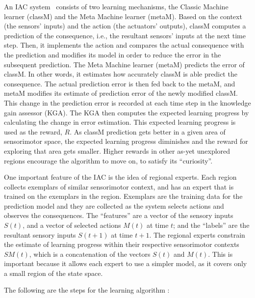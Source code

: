 An IAC system~\cite{Oudeyer2007} consists of two learning mechanisms, the Classic Machine learner (classM) and the Meta Machine learner (metaM). Based on the context (the sensors' inputs) and the action (the actuators' outputs), classM computes a prediction of the consequence, i.e., the resultant sensors' inputs at the next time step. Then, it implements the action and compares the actual consequence with the prediction and modifies its model in order to reduce the error in the subsequent prediction. The Meta Machine learner (metaM) predicts the error of classM. In other words, it estimates how accurately classM is able predict the consequence. The actual prediction error is then fed back to the metaM, and metaM modifies its estimate of prediction error of the newly modified classM. This change in the prediction error is recorded at each time step in the knowledge gain assessor (KGA). The KGA then computes the expected learning progress by calculating the change in error estimation. This expected learning progress is used as the reward, $R$. As classM prediction gets better in a given area of sensorimotor space, the expected learning progress diminishes and the reward for exploring that area gets smaller. Higher rewards in other as-yet unexplored regions encourage the algorithm to move on, to satisfy its ``curiosity''. 

One important feature of the IAC is the idea of regional experts. Each region collects exemplars of similar sensorimotor context, and has an expert that is trained on the exemplars in the region. Exemplars are the training data for the prediction model and they are collected as the system selects actions and observes the consequences. The ``features'' are a vector of the sensory inputs $S(t)$, and a vector of selected actions $M(t)$ at time $t$; and the ``labels'' are the resultant sensory inputs $S(t+1)$ at time $t+1$. The regional experts constrain the estimate of learning progress within their respective sensorimotor contexts $SM(t)$, which is a concatenation of the vectors $S(t)$ and $M(t)$. This is important because it allows each expert to use a simpler model, as it covers only a small region of the state space.  

The following are the steps for the learning algorithm \cite{Oudeyer2007}:

